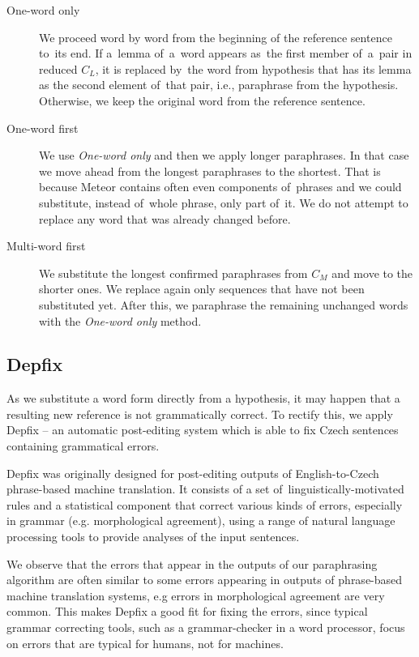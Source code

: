 \documentclass[11pt]{article}
\begin{document}
\begin{description}
\item[One-word only] We proceed word by word from the beginning of the reference 
sentence to~its end. If a~lemma of~a~word appears as~the first member of~a~pair 
in reduced $ C_{L} $, it is replaced by~the word from hypothesis that has its lemma
as the second element of~that pair, i.e., paraphrase from the hypothesis. Otherwise, 
we keep the original word from the reference sentence.
\item[One-word first] We use \textit{One-word only} and then we apply longer paraphrases.
In that case we move ahead from the longest paraphrases to the shortest. That is because 
Meteor contains often even components of~phrases and we could substitute, instead of~whole 
phrase, only part of~it. We do not attempt to replace any word that was already changed 
before.
\item[Multi-word first] We substitute the longest confirmed paraphrases from
$ C_{M} $ and move to the shorter ones. We replace again only sequences that have not
been substituted yet. After this, we paraphrase the remaining unchanged words
with the \textit{One-word only} method.
\end{description}

\subsection{Depfix}
As we substitute a word form directly from a hypothesis, it may happen that a 
resulting new reference is not grammatically correct. To rectify this, we apply
Depfix \cite{depfix} -- an automatic post-editing system which is able to fix 
Czech sentences containing grammatical errors.

Depfix was originally designed for post-editing outputs of English-to-Czech 
phrase-based machine translation. It consists of a set of~linguistically-motivated 
rules and a statistical component that correct various kinds of errors, especially 
in grammar (e.g. morphological agreement), using a range of natural language 
processing tools to provide analyses of the input sentences.

We observe that the errors that appear in the outputs of our paraphrasing 
algorithm are often similar to some errors appearing in outputs of phrase-based
machine translation systems, e.g errors in morphological agreement are very 
common. This makes Depfix a good fit for fixing the errors, since typical 
grammar correcting tools, such as a grammar-checker in a word processor, focus
on errors that are typical for humans, not for machines. 
\end{document}
